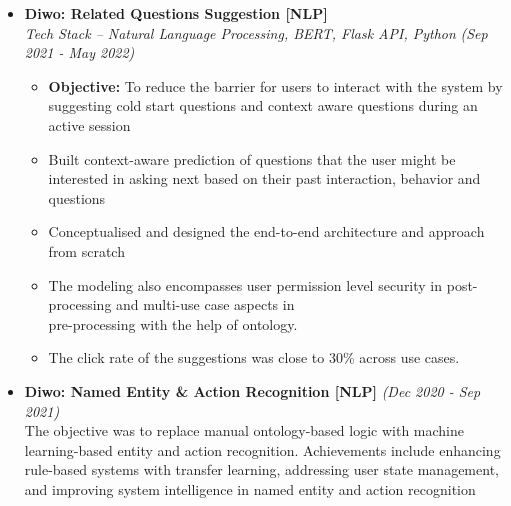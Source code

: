 \documentclass[a4paper,10pt]{article}
\newcommand{\isep}{-2 pt}
\begin{document}
\begin{itemize}
\item \textbf{Diwo: Related Questions Suggestion [NLP]}  \\
    \emph{Tech Stack -- Natural Language Processing, BERT, Flask API, Python } \hfill {\emph{(Sep 2021 - May 2022)}}
    \\[-0.6cm]
    \begin{itemize}\itemsep \isep
    	\item \textbf{Objective:} To reduce the barrier for users to interact with the system by suggesting cold start questions and context aware questions during an active session 
        \item Built context-aware prediction of questions that the user might be interested in asking next based on their past interaction, behavior and questions
        \item Conceptualised and designed the end-to-end architecture and approach from scratch 
        \item The modeling also encompasses user permission level security in post-processing and multi-use case aspects in \\ pre-processing with the help of ontology. 
        \item The click rate of the suggestions was close to 30\% across use cases.
        \\ [-0.5cm]
    \end{itemize}

\item \textbf{Diwo: Named Entity \& Action Recognition [NLP] } \hfill {\emph{(Dec 2020 - Sep 2021)}}\\The objective was to replace manual ontology-based logic with machine learning-based entity and action recognition. Achievements include enhancing rule-based systems with transfer learning, addressing user state management, and improving system intelligence in named entity and action recognition 
\\ [-0.5cm]



\end{itemize}
\end{document}
